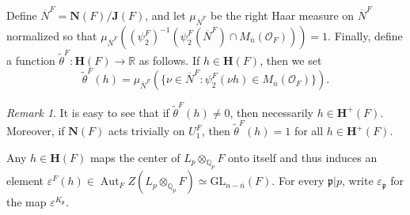 \documentclass[11pt,a4paper]{amsart}
\theoremstyle{plain}
\theoremstyle{remark}
\newtheorem{rem}[thm]{Remark}
\newcommand{\Q}{\mathbb{Q}}
\newcommand{\tensor}{\otimes}
\newcommand{\p}{\mathfrak{p}}
\newcommand{\dimL}{n}
\newcommand{\overdim}{\overline{n}}
\DeclareMathOperator{\Aut}{Aut}
\def \p {\ensuremath{\mathfrak{p}}}
\begin{document}
Define $\overline{N}^F = \mathbf{N}(F)/\mathbf{J}(F)$, and let $\mu_{\overline{N}^F}$ be the right Haar measure on $\overline{N}^F$ normalized so that $\mu_{\overline{N}^F}((\psi_2^F)^{-1}(\psi_2^F(\overline{N}^F) \cap M_{\overdim} (\mathcal{O}_F))) = 1$.  Finally, define a function $\widetilde{\theta}^F : \mathbf{H}(F) \to \mathbb{R}$ as follows.  If $h \in \mathbf{H}(F)$, then we set
\begin{equation*}
\widetilde{\theta}^F(h) = \mu_{\overline{N}^F} ( \{ \nu \in \overline{N}^F : \psi_2^F (\nu h) \in M_{\overdim} (\mathcal{O}_F) \} ).
\end{equation*}
\begin{rem} \label{rem:trivial.theta}
It is easy to see that if $\widetilde{\theta}^F(h) \neq 0$, then necessarily $h \in \mathbf{H}^+(F)$.  Moreover, if $\mathbf{N}(F)$ acts trivially on $U_1^F$, then $\widetilde{\theta}^F(h) = 1$ for all $h \in \mathbf{H}^+(F)$.
\end{rem}

Any $h \in \mathbf{H}(F)$ maps the center of $L_p \tensor_{\Q_p} F$ onto itself and thus induces an element $\varepsilon^F(h) \in \Aut_F Z(L_p \tensor_{\Q_p} F) \simeq \mathrm{GL}_{\dimL - \overdim}(F)$.  For every $\p | p$, write $\varepsilon_\p$ for the map $\varepsilon^{K_{\p}}$.  
\end{document}
